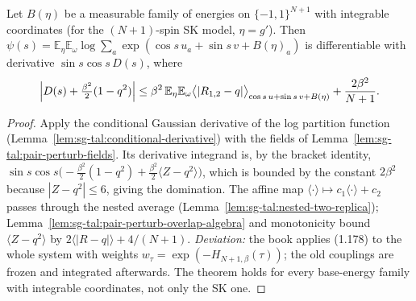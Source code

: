 \begin{theorem}
\label{thm:sg-tal:pair-perturb-path}
  \leanok
{}
Let $B(\eta)$ be a measurable family of energies on $\{-1,1\}^{N+1}$ with integrable coordinates (for the
$(N+1)$-spin SK model, $\eta=g'$).  Then
$\psi(s)=\mathbb E_\eta\mathbb E_\omega\log\sum_a\exp(\cos s\,u_a+\sin s\,v+B(\eta)_a)$ is differentiable
with derivative $\sin s\cos s\,D(s)$, where
\[
 \Bigl|D(s)+\tfrac{\beta^2}{2}(1-q^2)\Bigr|\le\beta^2\,\mathbb E_\eta\mathbb E_\omega
 \bigl\langle|R_{1,2}-q|\bigr\rangle_{\cos s\,u+\sin s\,v+B(\eta)}+\frac{2\beta^2}{N+1}.
\]
\end{theorem}
\begin{proof}
  \leanok
Apply the conditional Gaussian derivative of the log partition function
(Lemma~\ref{lem:sg-tal:conditional-derivative}) with the fields of
Lemma~\ref{lem:sg-tal:pair-perturb-fields}.  Its derivative integrand is, by the bracket identity,
$\sin s\cos s\bigl(-\tfrac{\beta^2}{2}(1-q^2)+\tfrac{\beta^2}{2}\langle Z-q^2\rangle\bigr)$, which is bounded
by the constant $2\beta^2$ because $|Z-q^2|\le6$, giving the domination.  The affine map
$\langle\cdot\rangle\mapsto c_1\langle\cdot\rangle+c_2$ passes through the nested average
(Lemma~\ref{lem:sg-tal:nested-two-replica}); Lemma~\ref{lem:sg-tal:pair-perturb-overlap-algebra}
and monotonicity bound $\langle Z-q^2\rangle$ by $2\langle|R-q|\rangle+4/(N+1)$.
\emph{Deviation:} the book applies (1.178) to the whole system with weights
$w_\tau=\exp(-H_{N+1,\beta}(\tau))$; the old couplings are frozen and integrated afterwards.
The theorem holds for every base-energy family with integrable coordinates, not only the SK one.
\end{proof}

